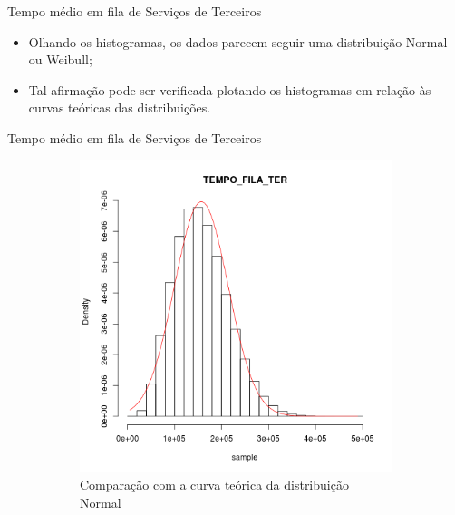 \documentclass[xcolor=dvipsnames]{beamer}
\let\olditem=\item%
\renewcommand{\item}{\olditem \justifying}%
\begin{document}
\begin{frame}{Tempo médio em fila de Serviços de Terceiros}
	\begin{itemize}
		\item Olhando os histogramas, os dados parecem seguir uma distribuição Normal ou Weibull;
        \bigskip
        \item Tal afirmação pode ser verificada plotando os histogramas em relação às curvas teóricas das distribuições.
	\end{itemize}
\end{frame}
	
\begin{frame}{Tempo médio em fila de Serviços de Terceiros}
	\begin{figure}[H]
		\centering
		\begin{subfigure}[H]{0.4\textwidth}
			\includegraphics[width=\textwidth]{img/CD-hist-norm-TEMPO_FILA_TER.png}
			\caption{Comparação com a curva teórica da distribuição Normal}
			\label{fig:CD-norm}
		\end{subfigure}
		\begin{subfigure}[H]{0.4\textwidth}

\end{subfigure}
\end{figure}
\end{frame}
\end{document}
